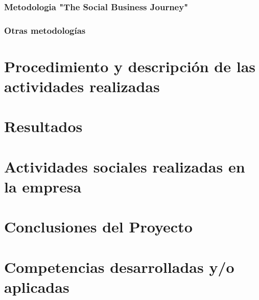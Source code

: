 \documentclass{memoir}
\begin{document}
\subsection{Metodologia "The Social Business Journey"}
\label{sec:org1ea5728}

\subsection{Otras metodologías}
\label{sec:org9f17ba3}


\chapter{Procedimiento y descripción de las actividades realizadas}


\chapter{Resultados}

\chapter{Actividades sociales realizadas en la empresa}

\chapter{Conclusiones del Proyecto}

\chapter{Competencias desarrolladas y/o aplicadas}



\end{document}
